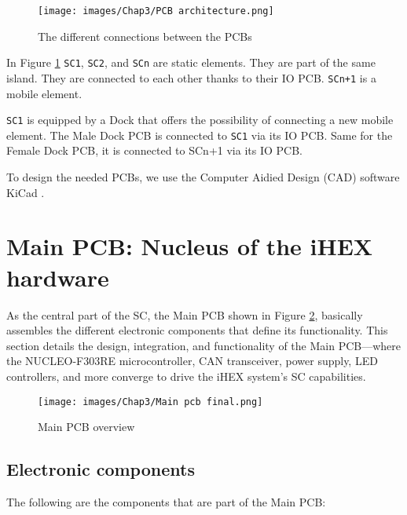 \begin{figure}[H]
\begin{center}
\texttt{[image: images/Chap3/PCB architecture.png]}\\
\caption{The different connections between the PCBs}
\label{connection PCB}
\end{center}
\end{figure}

In Figure \ref{connection PCB} \texttt{SC1}, \texttt{SC2}, and \texttt{SCn} are static elements. They are part of the same island. They are connected to each other thanks to their IO PCB. \texttt{SCn+1} is a mobile element.

\texttt{SC1} is equipped by a Dock that offers the possibility of connecting a new mobile element. The Male Dock PCB is connected to \texttt{SC1} via its IO PCB. Same for the Female Dock PCB, it is connected to SCn+1 via its IO PCB.

To design the needed PCBs, we use the Computer Aidied Design (CAD) software KiCad \cite{R29}.

\section{Main PCB: Nucleus of the iHEX hardware}

As the central part of the SC, the Main PCB shown in Figure \ref{Main PCB overview}, basically assembles the different electronic components that define its functionality. This section details the design, integration, and functionality of the Main PCB—where the NUCLEO-F303RE microcontroller, CAN transceiver, power supply, LED controllers, and more converge to drive the iHEX system's SC capabilities.

\begin{figure}[H]
\begin{center}
\texttt{[image: images/Chap3/Main pcb final.png]}\\
\caption{Main PCB overview}
\label{Main PCB overview}
\end{center}
\end{figure}

\subsection{Electronic components}

The following are the components that are part of the Main PCB:

